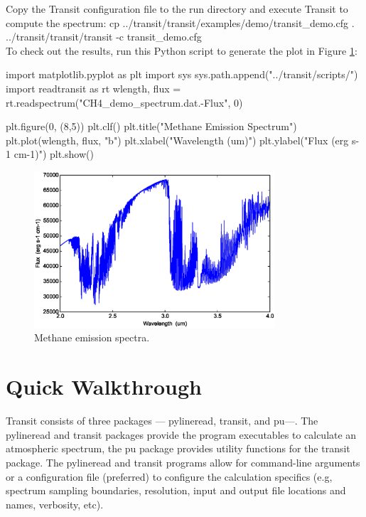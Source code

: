 \documentclass[letterpaper, 12pt]{article}
\begin{document}
\noindent Copy the Transit configuration file to the run
directory and execute Transit to compute the spectrum: \newline
{\tttb cp ../transit/transit/examples/demo/transit\_demo.cfg .} \\
{\tttb ../transit/transit/transit -c transit\_demo.cfg} \\

\noindent To check out the results, run this Python script to generate
the plot in Figure \ref{fig:demo}: \newline
\begin{python}
import matplotlib.pyplot as plt
import sys
sys.path.append("../transit/scripts/")
import readtransit as rt
wlength, flux = rt.readspectrum("CH4_demo_spectrum.dat.-Flux", 0)

plt.figure(0, (8,5))
plt.clf()
plt.title("Methane Emission Spectrum")
plt.plot(wlength, flux, "b")
plt.xlabel("Wavelength  (um)")
plt.ylabel("Flux  (erg s-1 cm-1)")
plt.show()
\end{python}

\begin{figure}[htb]
\centerline{
\includegraphics[width=0.8\textwidth, clip]{figs/Methane_emission_spectra.ps}}
\caption{\small Methane emission spectra.}
\label{fig:demo}
\end{figure}

\section{Quick Walkthrough}
\label{sec:walkthrough}

Transit consists of three packages --- pylineread, transit, and pu---.
The pylineread and transit packages provide the program executables to
calculate an atmospheric spectrum, the pu package provides utility
functions for the transit package.  The pylineread and transit
programs allow for command-line arguments or a configuration file
(preferred) to configure the calculation specifics (e.g, spectrum
sampling boundaries, resolution, input and output file locations and
names, verbosity, etc).
\end{document}
